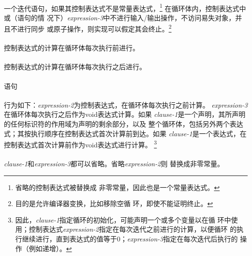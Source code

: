 {\paragraph{}
一个迭代语句，如果其控制表达式不是常量表达式，\footnote{省略的控制表达式被替换成
非零常量，因此也是一个常量表达式。} 在循环体内，控制表达式中或（语句的情
况下）\textit{expression-3}中不进行输入/输出操作，不访问易失对象，并且不进行同步
或原子操作，则实现可以假定其会终止。\footnote{目的是允许编译器变换，比如移除空循
环，即使不能证明终止。}

\paragraph{}
控制表达式的计算在循环体每次执行前进行。

\paragraph{}
控制表达式的计算在循环体每次执行之后进行。

\paragraph{}
语句                                                                          \\
\mbox{\hspace{4em}  \tm{;}  \tm{;}
   \tm{)} }                                    \\
行为如下：\textit{expression-2}为控制表达式，在循环体每次执行之前计算。
\textit{expression-3}在循环体每次执行之后作为void表达式计算。如果
\textit{clause-1}是一个声明，其所声明的任何标识符的作用域为声明的剩余部分，以及
整个循环体，包括另外两个表达式；其按执行顺序在控制表达式首次计算前到达。如果
\textit{clause-1}是一个表达式，在控制表达式首次计算前作为void表达式进行计算。
\footnote{因此，\textit{clause-1}指定循环的初始化，可能声明一个或多个变量以在循
环中使用；控制表达式\textit{expression-2}指定在每次迭代之前进行的计算，以便循环
的执行继续进行，直到表达式的值等于0；\textit{expression-3}指定在每次迭代后执行的
操作（例如递增）。}

\paragraph{}
\textit{clause-1}和\textit{expression-3}都可以省略。省略\textit{expression-2}则
替换成非零常量。

}

